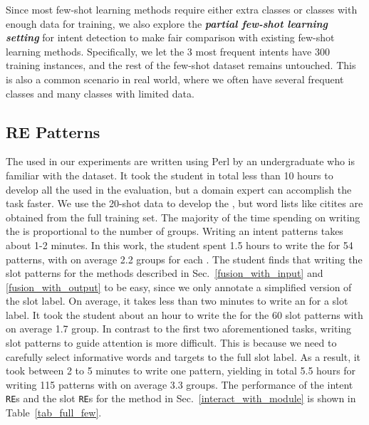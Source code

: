 Since most few-shot learning methods require either extra classes or classes with enough data for training, we also explore the \textbf{\emph{partial few-shot learning setting}} for intent detection to make fair comparison with existing few-shot learning methods. Specifically, we let the 3 most frequent intents have 300 training instances, and the rest of the few-shot dataset remains untouched.
This is also a common scenario in real world, where we often have several frequent classes and many classes with limited data.

\subsection{RE Patterns}
\label{re_in_exp} The \REs used in our experiments are written using Perl by an undergraduate who is familiar with the dataset. It took the
student in total less than 10 hours to develop all the \REs used in the evaluation, but a domain expert can accomplish the task faster. We
use the 20-shot data to develop the \REs, but word lists like citites are obtained from the full training set. The majority of the time
spending on writing the \REs is proportional to  the number of \RE groups. Writing an intent patterns takes about 1-2 minutes. In this
work, the student spent 1.5 hours to write the \REs for 54 patterns, with on average 2.2 \RE groups for each \RE. The student finds that
writing the slot patterns for the methods described in Sec.~\ref{fusion_with_input} and \ref{fusion_with_output} to be easy, since we only
annotate a simplified version of the slot label. On average, it takes less than two minutes to write an \RE for a slot label. It took the
student about an hour to write the \REs for the 60 slot patterns with on average 1.7 \RE group. In contrast to the first two aforementioned
tasks, writing slot patterns to guide attention is more difficult. This is because we need to carefully select informative words and
targets to the full slot label. As a result, it took between 2 to 5 minutes to write one pattern, yielding in total 5.5 hours for writing
115 patterns with on average 3.3 \RE groups. The performance of the intent \texttt{RE}s and the slot \texttt{RE}s for the method in
Sec.~\ref{interact_with_module} is shown in Table~\ref{tab_full_few}. 

